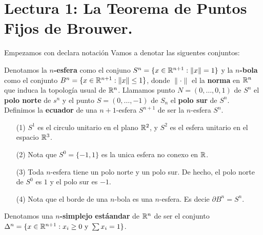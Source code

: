 \section*{Lectura 1: La Teorema de Puntos Fijos de Brouwer.}

Empezamos con declara notaci\'on Vamos a denotar las siguentes conjuntos:

\begin{definition}
    Denotamos la \textbf{$n$-esfera} como el conjuno $S^n=\{x \in
    \mathbb{R}^{n+1} : \|x\|=1\}$ y la \textbf{$n$-bola} como el conjunto $B^n=\{x
    \in \mathbb{R}^{n+1} : \|x\| \leq 1\}$, donde $\|\cdot\|$ el la \textbf{norma} en
    $\mathbb{R}^n$ que induca la topolog\'ia usual de $\mathbb{R}^n$. Llamamos punto
    $N=(0,\dots,0,1)$ de $S^n$ el \textbf{polo norte} de $s^n$ y el punto $S=(0,
    \dots, -1)$ de $S_n$ el  \textbf{polo sur} de $S^n$. Definimos la
    \textbf{ecuador} de una $n+1$-esfera $S^{n+1}$ de ser la $n$-esfera $S^n$.
\end{definition}

\begin{example}\label{exmp_1}
    \begin{enumerate}
        \item[(1)] $S^1$ es el circulo unitario en el plano $\mathbb{R}^2$, y  $S^2$ es
            el esfera unitario en el espacio $\mathbb{R}^3$.

        \item[(2)] Nota que $S^0=\{-1,1\}$ es la unica esfera no conexo en $\mathbb{R}$.

        \item[(3)] Toda $n$-esfera tiene un polo norte y un polo sur. De hecho,
            el polo norte de $S^0$ es $1$ y el polo sur es $-1$.

        \item[(4)] Nota que el borde de una $n$-bola es una  $n$-esfera. Es
            decie  $\partial{B^n}=S^n$.
    \end{enumerate}
\end{example}

\begin{definition}
    Denotamos una \textbf{$n$-simplejo est\'aandar} de $\mathbb{R}^n$ de ser el conjunto
    $\Delta^n=\{x \in \mathbb{R}^{n+1} : x_i \geq 0 \text{ y } \sum{x_i}=1\}$.
\end{definition}

